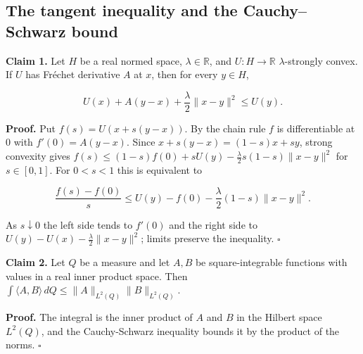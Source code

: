 \documentclass[11pt,a4paper]{report}
\begin{document}
\subsection{\texorpdfstring{The tangent inequality and the Cauchy–Schwarz bound}{The tangent inequality and the Cauchy–Schwarz bound}}


\textbf{Claim 1.} Let \(H\) be a real normed space, \(\lambda\in\mathbb R\), and \(U:H\to\mathbb R\) \(\lambda\)-strongly convex. If \(U\) has Fréchet derivative \(A\) at \(x\), then for every \(y\in H\),


\[U(x)+A(y-x)+\frac\lambda2\|x-y\|^2\le U(y).\]


\textbf{Proof.} Put \(f(s)=U(x+s(y-x))\). By the chain rule \(f\) is differentiable at \(0\) with \(f'(0)=A(y-x)\). Since \(x+s(y-x)=(1-s)x+sy\), strong convexity gives \(f(s)\le(1-s)f(0)+sU(y)-\frac\lambda2s(1-s)\|x-y\|^2\) for \(s\in[0,1]\). For \(0<s<1\) this is equivalent to


\[\frac{f(s)-f(0)}s\le U(y)-f(0)-\frac\lambda2(1-s)\|x-y\|^2.\]


As \(s\downarrow0\) the left side tends to \(f'(0)\) and the right side to \(U(y)-U(x)-\frac\lambda2\|x-y\|^2\); limits preserve the inequality. \(\square\)




\textbf{Claim 2.} Let \(Q\) be a measure and let \(A,B\) be square-integrable functions with values in a real inner product space. Then \(\int\langle A,B\rangle\,dQ\le\|A\|_{L^2(Q)}\|B\|_{L^2(Q)}\).




\textbf{Proof.} The integral is the inner product of \(A\) and \(B\) in the Hilbert space \(L^2(Q)\), and the Cauchy-Schwarz inequality bounds it by the product of the norms. \(\square\)
\end{document}
